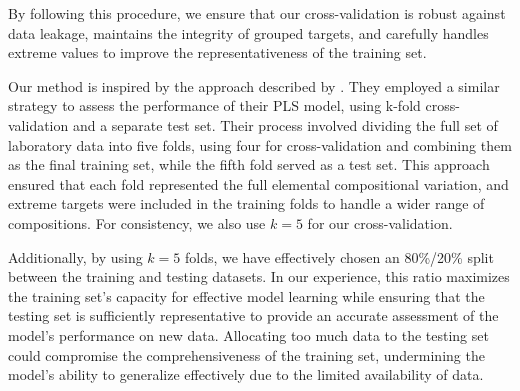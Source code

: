 By following this procedure, we ensure that our cross-validation is robust against data leakage, maintains the integrity of grouped targets, and carefully handles extreme values to improve the representativeness of the training set.

Our method is inspired by the approach described by \citet{andersonImprovedAccuracyQuantitative2017}.
They employed a similar strategy to assess the performance of their PLS model, using k-fold cross-validation and a separate test set.
Their process involved dividing the full set of laboratory data into five folds, using four for cross-validation and combining them as the final training set, while the fifth fold served as a test set.
This approach ensured that each fold represented the full elemental compositional variation, and extreme targets were included in the training folds to handle a wider range of compositions.
For consistency, we also use \(k=5\) for our cross-validation.

Additionally, by using $k=5$ folds, we have effectively chosen an 80\%/20\% split between the training and testing datasets.
In our experience, this ratio maximizes the training set's capacity for effective model learning while ensuring that the testing set is sufficiently representative to provide an accurate assessment of the model's performance on new data.
Allocating too much data to the testing set could compromise the comprehensiveness of the training set, undermining the model's ability to generalize effectively due to the limited availability of data.

